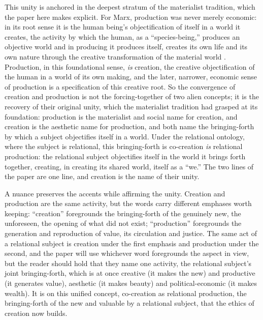 This unity is anchored in the deepest stratum of the materialist tradition, which the paper here makes explicit. For Marx, production was never merely economic: in its root sense it is the human being's objectification of itself in a world it creates, the activity by which the human, as a ``species-being,'' produces an objective world and in producing it produces itself, creates its own life and its own nature through the creative transformation of the material world \parencite{marx1988}. Production, in this foundational sense, \emph{is} creation, the creative objectification of the human in a world of its own making, and the later, narrower, economic sense of production is a specification of this creative root. So the convergence of creation and production is not the forcing-together of two alien concepts; it is the recovery of their original unity, which the materialist tradition had grasped at its foundation: production is the materialist and social name for creation, and creation is the aesthetic name for production, and both name the bringing-forth by which a subject objectifies itself in a world. Under the relational ontology, where the subject is relational, this bringing-forth is co-creation \emph{is} relational production: the relational subject objectifies itself in the world it brings forth together, creating, in creating its shared world, itself as a ``we.'' The two lines of the paper are one line, and creation is the name of their unity.

A nuance preserves the accents while affirming the unity. Creation and production are the same activity, but the words carry different emphases worth keeping: ``creation'' foregrounds the bringing-forth of the genuinely new, the unforeseen, the opening of what did not exist; ``production'' foregrounds the generation and reproduction of value, its circulation and justice. The same act of a relational subject is creation under the first emphasis and production under the second, and the paper will use whichever word foregrounds the aspect in view, but the reader should hold that they name one activity, the relational subject's joint bringing-forth, which is at once creative (it makes the new) and productive (it generates value), aesthetic (it makes beauty) and political-economic (it makes wealth). It is on this unified concept, co-creation as relational production, the bringing-forth of the new and valuable by a relational subject, that the ethics of creation now builds.

